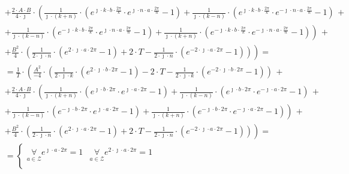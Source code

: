 \begin{task}
\begin{align*}
&+ \left. \frac{2 \cdot A\cdot B}{4 \cdot \jmath} \cdot \left( \frac{1}{\jmath \cdot \left(k+n\right)} \cdot \left( e^{\jmath \cdot k \cdot b \cdot \frac{2\pi}{k}}\cdot e^{\jmath \cdot n \cdot a \cdot \frac{2\pi}{n}}-1\right) + \frac{1}{\jmath \cdot \left(k-n\right) } \cdot \left( e^{\jmath \cdot k \cdot b \cdot \frac{2\pi}{k}} \cdot e^{-\jmath \cdot n \cdot a \cdot \frac{2\pi}{n}}- 1\right) \,+\right.\right.\\
&+ \left.\left.  \frac{1}{\jmath \cdot \left(k-n\right)} \cdot \left( e^{-\jmath \cdot k \cdot b \cdot \frac{2\pi}{k}} \cdot e^{\jmath \cdot n \cdot a \cdot \frac{2\pi}{n}}- 1\right) + \frac{1}{\jmath \cdot \left(k+n\right) } \cdot \left( e^{-\jmath \cdot k \cdot b \cdot \frac{2\pi}{k}} \cdot e^{-\jmath \cdot n \cdot a \cdot \frac{2\pi}{n}}- 1 \right) \right)\,+\right.\\
&+ \left. \frac{B^2}{4} \cdot \left( \frac{1}{2\cdot \jmath \cdot n} \cdot \left( e^{2\cdot \jmath \cdot a \cdot 2\pi} - 1\right)+2\cdot T - \frac{1}{2\cdot \jmath \cdot n}\cdot \left( e^{-2\cdot \jmath \cdot a \cdot 2\pi} - 1 \right) \right) \right)=\\
&=\frac{1}{T} \cdot \left( \frac{A^2}{-4}\cdot \left( \frac{1}{2\cdot \jmath \cdot k} \cdot \left( e^{2\cdot \jmath \cdot b \cdot 2\pi} -  1 \right) -2 \cdot T - \frac{1}{2\cdot \jmath \cdot k}\cdot \left(e^{-2\cdot \jmath \cdot b \cdot 2\pi} - 1 \right) \right) \,+\right. \\
&+ \left. \frac{2 \cdot A\cdot B}{4 \cdot \jmath} \cdot \left( \frac{1}{\jmath \cdot \left(k+n\right)} \cdot \left( e^{\jmath \cdot b \cdot 2\pi}\cdot e^{\jmath \cdot a \cdot 2\pi}-1\right) + \frac{1}{\jmath \cdot \left(k-n\right) } \cdot \left( e^{\jmath \cdot b \cdot 2\pi} \cdot e^{-\jmath \cdot a \cdot 2\pi}- 1\right) \,+\right.\right.\\
&+ \left.\left.  \frac{1}{\jmath \cdot \left(k-n\right)} \cdot \left( e^{-\jmath \cdot b \cdot 2\pi} \cdot e^{\jmath \cdot a \cdot 2\pi}- 1\right) + \frac{1}{\jmath \cdot \left(k+n\right) } \cdot \left( e^{-\jmath \cdot b \cdot 2\pi} \cdot e^{-\jmath \cdot a \cdot 2\pi}- 1 \right) \right)\,+\right.\\
&+ \left. \frac{B^2}{4} \cdot \left( \frac{1}{2\cdot \jmath \cdot n} \cdot \left( e^{2\cdot \jmath \cdot a \cdot 2\pi} - 1\right)+2\cdot T - \frac{1}{2\cdot \jmath \cdot n}\cdot \left( e^{-2\cdot \jmath \cdot a \cdot 2\pi} - 1 \right) \right) \right)=\\
&=\left\{\begin{array}{ll}
\underset{a \in \mathcal{Z}}{\forall} e^{\jmath \cdot a \cdot 2\pi} = 1 & \underset{a \in \mathcal{Z}}{\forall} e^{2\cdot \jmath \cdot a \cdot 2\pi} = 1\\

\end{array}
\end{align*}
\end{task}
